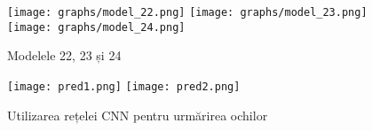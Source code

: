 \begin{figure}[h]
    \centering
    \texttt{[image: graphs/model\_22.png]}
    \texttt{[image: graphs/model\_23.png]}
    \texttt{[image: graphs/model\_24.png]}
    \caption{Modelele 22, 23 și 24}
\end{figure}

\begin{figure}[h]
    \centering
    \texttt{[image: pred1.png]}
    \texttt{[image: pred2.png]}
    \caption{Utilizarea rețelei CNN pentru urmărirea ochilor}
\end{figure}